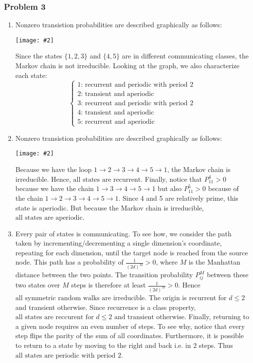 \documentclass[letterpaper,12pt]{article}
\newcommand*{\qimg}[2]{\\ \begin{center}\texttt{[image: \#2]}\end{center}}
\begin{document}
\begin{flushleft}
    \subsubsection*{Problem 3}
    \begin{enumerate}[label=(\alph*)]

        \item
        Nonzero transistion probabilities are described graphically as follows:
        \qimg{0.8}{img/q3a.jpg}
        Since the states $\{1, 2, 3\}$ and $\{4, 5\}$ are in different communicating classes, the Markov chain is $\boxed{\text{not irreducible}}$. Looking at the graph, we also characterize each state:
        $$\boxed{\begin{cases}
            \text{1: recurrent and periodic with period 2} \\
            \text{2: transient and aperiodic} \\
            \text{3: recurrent and periodic with period 2} \\
            \text{4: transient and aperiodic} \\
            \text{5: recurrent and aperiodic}
        \end{cases}}$$

        \item
        Nonzero transistion probabilities are described graphically as follows:
        \qimg{0.8}{img/q3b.jpg}
        Because we have the loop $1 \rightarrow 2 \rightarrow 3 \rightarrow 4 \rightarrow 5 \rightarrow 1$, the Markov chain is $\boxed{\text{irreducible}}$. Hence, $\boxed{\text{all states are recurrent}}$. Finally, notice that $P_{11}^4 > 0$ because we have the chain $1 \rightarrow 3 \rightarrow 4 \rightarrow 5 \rightarrow 1$ but also $P_{11}^5 > 0$ because of the chain $1 \rightarrow 2 \rightarrow 3 \rightarrow 4 \rightarrow 5 \rightarrow 1$. Since 4 and 5 are relatively prime, this state is aperiodic. But because the Markov chain is irreducible, $\boxed{\text{all states are aperiodic}}$.

        \item
        Every pair of states is communicating. To see how, we consider the path taken by incrementing/decrementing a single dimension's coordinate, repeating for each dimension, until the target node is reached from the source node. This path has a probability of $\frac{1}{(2d)^M} > 0$, where $M$ is the Manhattan distance between the two points. The transition probability $P_{ij}^M$ between these two states over $M$ steps is therefore at least $\frac{1}{(2d)^M} > 0$. Hence $\boxed{\text{all symmetric random walks are irreducible}}$. The origin is recurrent for $d \leq 2$ and transient otherwise. Since recurrence is a class property, $\boxed{\text{all states are reccurent for } d \leq 2 \text{ and transient otherwise}}$. Finally, returning to a given node requires an even number of steps. To see why, notice that every step flips the parity of the sum of all coordinates. Furthermore, it is possible to return to a state by moving to the right and back i.e. in 2 steps. Thus $\boxed{\text{all states are periodic with period 2}}$.


\end{enumerate}
\end{flushleft}
\end{document}
